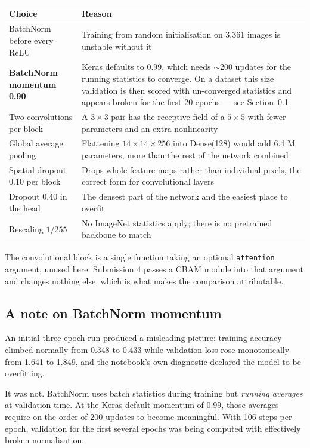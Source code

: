 \documentclass[11pt,a4paper]{article}
\begin{document}
\begin{tabularx}{\linewidth}{@{}p{4.6cm}X@{}}
\toprule
\textbf{Choice} & \textbf{Reason} \\
\midrule
BatchNorm before every ReLU & Training from random initialisation on 3,361 images is unstable without it \\
\textbf{BatchNorm momentum 0.90} & Keras defaults to 0.99, which needs $\sim$200 updates for the running statistics to converge. On a dataset this size validation is then scored with un-converged statistics and appears broken for the first 20 epochs --- see Section~\ref{sec:bn} \\
Two convolutions per block & A $3{\times}3$ pair has the receptive field of a $5{\times}5$ with fewer parameters and an extra nonlinearity \\
Global average pooling & Flattening $14{\times}14{\times}256$ into Dense(128) would add 6.4 M parameters, more than the rest of the network combined \\
Spatial dropout 0.10 per block & Drops whole feature maps rather than individual pixels, the correct form for convolutional layers \\
Dropout 0.40 in the head & The densest part of the network and the easiest place to overfit \\
Rescaling $1/255$ & No ImageNet statistics apply; there is no pretrained backbone to match \\
\bottomrule
\end{tabularx}

The convolutional block is a single function taking an optional \texttt{attention}
argument, unused here. Submission 4 passes a CBAM module into that argument and changes
nothing else, which is what makes the comparison attributable.

\subsection{A note on BatchNorm momentum}
\label{sec:bn}

An initial three-epoch run produced a misleading picture: training accuracy climbed
normally from 0.348 to 0.433 while validation loss rose monotonically from 1.641 to
1.849, and the notebook's own diagnostic declared the model to be overfitting.

It was not. BatchNorm uses batch statistics during training but \emph{running averages}
at validation time. At the Keras default momentum of 0.99, those averages require on the
order of 200 updates to become meaningful. With 106 steps per epoch, validation for the
first several epochs was being computed with effectively broken normalisation.
\end{document}
